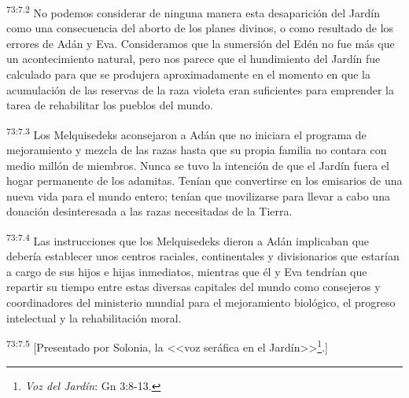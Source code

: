 \par
\textsuperscript{73:7.2} No podemos considerar de ninguna manera esta desaparición del Jardín como una consecuencia del aborto de los planes divinos, o como resultado de los errores de Adán y Eva. Consideramos que la sumersión del Edén no fue más que un acontecimiento natural, pero nos parece que el hundimiento del Jardín fue calculado para que se produjera aproximadamente en el momento en que la acumulación de las reservas de la raza violeta eran suficientes para emprender la tarea de rehabilitar los pueblos del mundo.

\par
\textsuperscript{73:7.3} Los Melquisedeks aconsejaron a Adán que no iniciara el programa de mejoramiento y mezcla de las razas hasta que su propia familia no contara con medio millón de miembros. Nunca se tuvo la intención de que el Jardín fuera el hogar permanente de los adamitas. Tenían que convertirse en los emisarios de una nueva vida para el mundo entero; tenían que movilizarse para llevar a cabo una donación desinteresada a las razas necesitadas de la Tierra.

\par
\textsuperscript{73:7.4} Las instrucciones que los Melquisedeks dieron a Adán implicaban que debería establecer unos centros raciales, continentales y divisionarios que estarían a cargo de sus hijos e hijas inmediatos, mientras que él y Eva tendrían que repartir su tiempo entre estas diversas capitales del mundo como consejeros y coordinadores del ministerio mundial para el mejoramiento biológico, el progreso intelectual y la rehabilitación moral.

\par
\textsuperscript{73:7.5} [Presentado por Solonia, la <<voz seráfica en el Jardín>>\footnote{\textit{Voz del Jardín}: Gn 3:8-13.}.]